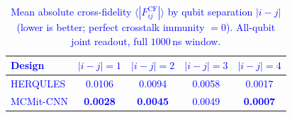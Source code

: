 \begin{table}[t]
  \centering
  \footnotesize
  \textcolor{blue}{%
  \caption{Mean absolute cross-fidelity $\langle|F^{\mathrm{CF}}_{ij}|\rangle$ by
  qubit separation $|i-j|$ (lower is better; perfect crosstalk immunity $=0$).
  All-qubit joint readout, full $1000$\,ns window.}
  \label{tab:crossfid}
  \begin{tabular}{lcccc}
    \toprule
    Design & $|i-j|{=}1$ & $|i-j|{=}2$ & $|i-j|{=}3$ & $|i-j|{=}4$ \\
    \midrule
    HERQULES  & 0.0106 & 0.0094 & 0.0058 & 0.0017 \\
    MCMit-CNN & \textbf{0.0028} & \textbf{0.0045} & 0.0049 & \textbf{0.0007} \\
    \bottomrule
  \end{tabular}}
\end{table}

